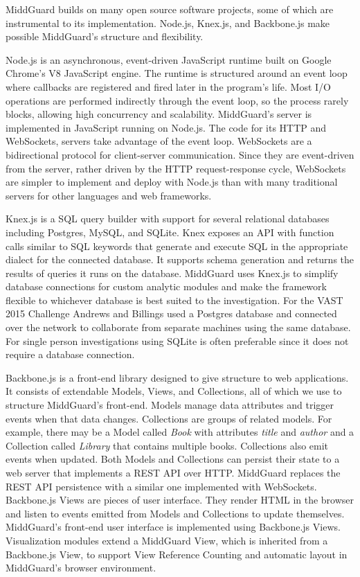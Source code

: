 \documentclass[midd]{thesis}
\begin{document}
MiddGuard builds on many open source software projects, some of which are
instrumental to its implementation. Node.js, Knex.js, and Backbone.js make
possible MiddGuard's structure and flexibility.

Node.js \cite{nodejs} is an asynchronous, event-driven JavaScript runtime built
on Google Chrome's V8 JavaScript engine. The runtime is structured around an
event loop where callbacks are registered and fired later in the program's life.
Most I/O operations are performed indirectly through the event loop, so the
process rarely blocks, allowing high concurrency and scalability. MiddGuard's
server is implemented in JavaScript running on Node.js. The code for its HTTP
and WebSockets, servers take advantage of the event loop. WebSockets are a
bidirectional protocol for client-server communication. Since they are
event-driven from the server, rather driven by the HTTP request-response cycle,
WebSockets are simpler to implement and deploy with Node.js than with many
traditional servers for other languages and web frameworks.

Knex.js \cite{knexjs} is a SQL query builder with support for several relational
databases including Postgres, MySQL, and SQLite. Knex exposes an API with
function calls similar to SQL keywords that generate and execute SQL in the
appropriate dialect for the connected database. It supports schema generation
and returns the results of queries it runs on the database. MiddGuard uses
Knex.js to simplify database connections for custom analytic modules and make
the framework flexible to whichever database is best suited to the
investigation. For the VAST 2015 Challenge Andrews and Billings used a Postgres
database and connected over the network to collaborate from separate machines
using the same database. For single person investigations using SQLite is often
preferable since it does not require a database connection.

Backbone.js \cite{backbone} is a front-end library designed to give structure to
web applications. It consists of extendable Models, Views, and Collections, all
of which we use to structure MiddGuard's front-end. Models manage data
attributes and trigger events when that data changes. Collections are groups of
related models. For example, there may be a Model called \textit{Book} with
attributes \textit{title} and \textit{author} and a Collection called
\textit{Library} that contains multiple books. Collections also emit events when
updated. Both Models and Collections can persist their state to a web server
that implements a REST API over HTTP. MiddGuard replaces the REST API
persistence with a similar one implemented with WebSockets. Backbone.js Views
are pieces of user interface. They render HTML in the browser and listen to
events emitted from Models and Collections to update themselves. MiddGuard's
front-end user interface is implemented using Backbone.js Views. Visualization
modules extend a MiddGuard View, which is inherited from a Backbone.js View, to
support View Reference Counting and automatic layout in MiddGuard's browser
environment.
\end{document}
